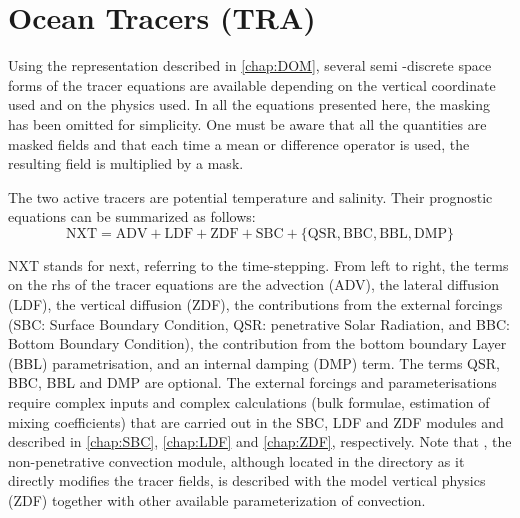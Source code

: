 \documentclass[../main/NEMO_manual]{subfiles}
\begin{document}
\chapter{Ocean Tracers (TRA)}
\label{chap:TRA}

\minitoc



Using the representation described in \autoref{chap:DOM}, several semi -discrete space forms of
the tracer equations are available depending on the vertical coordinate used and on the physics used.
In all the equations presented here, the masking has been omitted for simplicity.
One must be aware that all the quantities are masked fields and that each time a mean or
difference operator is used, the resulting field is multiplied by a mask.

The two active tracers are potential temperature and salinity.
Their prognostic equations can be summarized as follows:
\[
  \text{NXT} =     \text{ADV} + \text{LDF} + \text{ZDF} + \text{SBC}
               + \{\text{QSR},  \text{BBC},  \text{BBL},  \text{DMP}\}
\]

NXT stands for next, referring to the time-stepping.
From left to right, the terms on the rhs of the tracer equations are the advection (ADV),
the lateral diffusion (LDF), the vertical diffusion (ZDF), the contributions from the external forcings
(SBC: Surface Boundary Condition, QSR: penetrative Solar Radiation, and BBC: Bottom Boundary Condition),
the contribution from the bottom boundary Layer (BBL) parametrisation, and an internal damping (DMP) term.
The terms QSR, BBC, BBL and DMP are optional.
The external forcings and parameterisations require complex inputs and complex calculations
(\eg bulk formulae, estimation of mixing coefficients) that are carried out in the SBC,
LDF and ZDF modules and described in \autoref{chap:SBC}, \autoref{chap:LDF} and
\autoref{chap:ZDF}, respectively.
Note that , the non-penetrative convection module, although located in
the  directory as it directly modifies the tracer fields,
is described with the model vertical physics (ZDF) together with
other available parameterization of convection.
\end{document}
